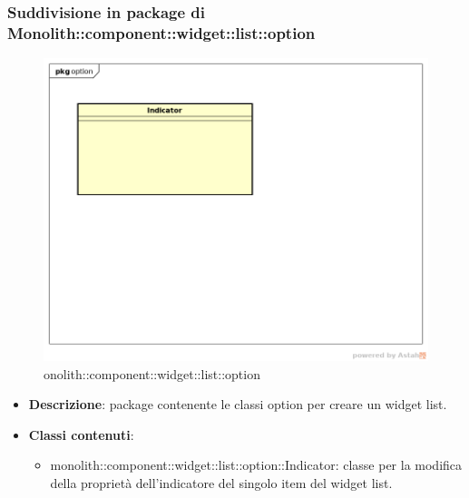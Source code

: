 \subsubsection{Suddivisione in package  di Monolith::component::widget::list::option}
\label{monolith::component::widget::list::option}
\begin{figure}[H]
	\centering
	\includegraphics[scale=0.5]{Sezioni/imgPackage/component_widget_list_option.png}
	\caption{onolith::component::widget::list::option}
\end{figure}
\begin{itemize}
	\item{\textbf{Descrizione}}: package contenente le classi option per creare un widget list.
	\item{\textbf{Classi contenuti}}:
	\begin{itemize}
	\item{monolith::component::widget::list::option::Indicator}: classe per la modifica della proprietà dell'indicatore del singolo item del widget list.
	\end{itemize}
\end{itemize}




